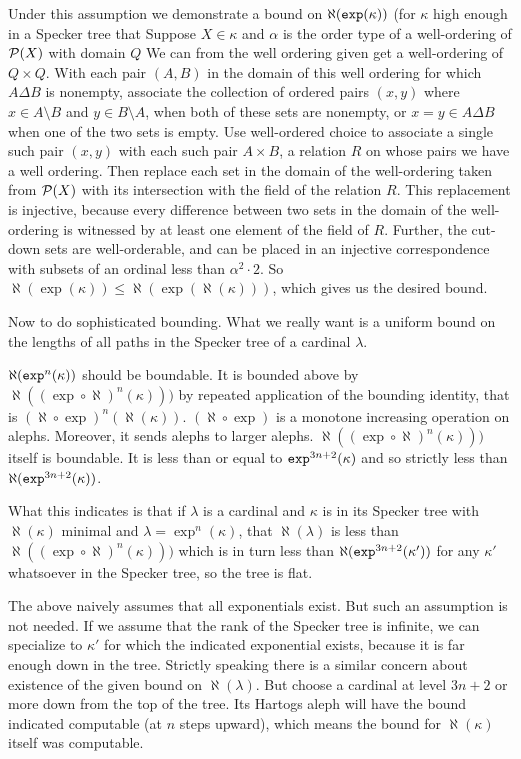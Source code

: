 \documentclass[12pt]{article}
\begin{document}
Under this assumption we demonstrate a bound on $\aleph({\tt exp}(\kappa))$ (for $\kappa$ high enough in a Specker tree that Suppose $X \in \kappa$ and $\alpha$ is the order type of a well-ordering of ${\cal P}(X)$ with domain $Q$  We can from the well ordering given
get a well-ordering of $Q \times Q$.  With each pair $(A,B)$ in the domain of this well ordering for which $A \Delta B$ is nonempty, associate the collection of ordered pairs $(x,y)$ where $x \in A \setminus B$ and $y \in B\setminus A$, when both of these sets are nonempty, or $x=y \in A \Delta B$ when one of the two sets is empty.  Use well-ordered choice to associate a single such pair $(x,y)$ with each such pair $A\times B$, a relation $R$ on whose pairs we have a well ordering.
Then replace each set in the domain of the well-ordering taken from ${\cal P}(X)$ with its intersection with the field of the relation $R$.  This replacement is injective, because every difference between two sets in the domain of the well-ordering is witnessed by at least one element of the field of $R$.  Further, the cut-down sets are well-orderable, and can be placed in an injective correspondence with subsets of an ordinal less than $\alpha^2\cdot 2$.
So $\aleph({\exp}(\kappa)) \leq \aleph(\exp(\aleph(\kappa)))$, which gives us the desired bound. 

Now to do sophisticated bounding.  What we really want is a uniform bound on the lengths of all paths in the Specker tree of a cardinal $\lambda$.

$\aleph({\tt exp}^n(\kappa))$ should be boundable.   It is bounded above by $\aleph((\exp\circ \aleph)^{n}(\kappa)))$ by repeated application of the bounding identity, that is $(\aleph \circ \exp)^n(\aleph(\kappa))$.   $(\aleph \circ \exp)$ is a monotone increasing operation on alephs.  Moreover, it sends alephs to larger alephs.  $\aleph((\exp\circ \aleph)^{n}(\kappa)))$ itself is boundable.  It is less than or equal to
${\tt exp}^{3n+2}(\kappa)$ and so strictly less than $\aleph({\tt exp}^{3n+2}(\kappa))$.

What this indicates is that if $\lambda$ is a cardinal and $\kappa$ is in its Specker tree with $\aleph(\kappa)$ minimal and $\lambda = \exp^n(\kappa)$, that $\aleph(\lambda)$ is less than 
$\aleph((\exp\circ \aleph)^{n}(\kappa)))$ which is in turn less than $\aleph({\tt exp}^{3n+2}(\kappa'))$ for any $\kappa'$ whatsoever in the Specker tree, so the tree is flat.

The above naively assumes that all exponentials exist.  But such an assumption is not needed.  If we assume that the rank of the Specker tree is infinite, we can specialize to
$\kappa'$ for which the indicated exponential exists, because it is far enough down in the tree.  Strictly speaking there is a similar concern about existence of the given bound on $\aleph(\lambda)$.
But choose a cardinal at level $3n+2$ or more down from the top of the tree.  Its Hartogs aleph will have the bound indicated computable (at $n$ steps upward), which means the bound for $\aleph(\kappa)$ itself was computable.
\end{document}
